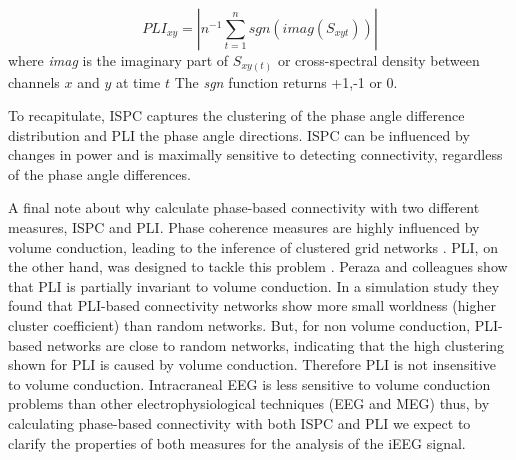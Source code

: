 \documentclass[11pt, onecolumn]{article}
\begin{document}
\begin{equation}
PLI_{xy} = |n^{-1} \sum_{t=1}^{n}sgn(imag(S_{xyt}))|
\label{eq:pli}
\end{equation}
where \textit{imag} is the imaginary part of $S_{xy(t)}$ or cross-spectral density between channels $x$ and $y$ at time $t$
The \textit{sgn} function returns +1,-1 or 0. %

To recapitulate, ISPC captures the clustering of the phase angle difference distribution and PLI the phase angle directions. ISPC can be influenced by changes in power and is maximally sensitive to detecting connectivity, regardless of the phase angle differences. 

A final note about why calculate phase-based connectivity with two different measures, ISPC and PLI. Phase coherence measures are highly influenced by volume conduction, leading to the inference of clustered grid networks \citep{mormann2000mean}. PLI, on the other hand, was designed to tackle this problem \cite{stam2007phase}. Peraza and colleagues \citep{peraza2012volume} show that PLI is partially invariant to volume conduction. In a simulation study they found that PLI-based connectivity networks show more small worldness (higher cluster coefficient) than random networks. But, for non volume conduction, PLI-based networks are close to random networks, indicating that the high clustering shown for PLI is caused by volume conduction. Therefore PLI is not insensitive to volume conduction. Intracraneal EEG is less sensitive to volume conduction problems than other electrophysiological techniques (EEG and MEG) thus, by calculating phase-based connectivity with both ISPC and PLI we expect to clarify the properties of both measures for the analysis of the iEEG signal.
\end{document}
